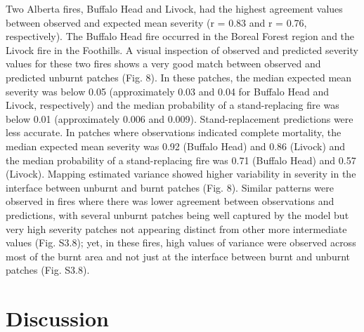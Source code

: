 \documentclass[
  numafflabel,
  authoryear,
  preprint]{elsarticle}
\begin{document}
Two Alberta fires, Buffalo Head and Livock, had the highest agreement
values between observed and expected mean severity (r = 0.83 and r =
0.76, respectively). The Buffalo Head fire occurred in the Boreal Forest
region and the Livock fire in the Foothills. A visual inspection of
observed and predicted severity values for these two fires shows a very
good match between observed and predicted unburnt patches (Fig. 8). In
these patches, the median expected mean severity was below 0.05
(approximately 0.03 and 0.04 for Buffalo Head and Livock, respectively)
and the median probability of a stand-replacing fire was below 0.01
(approximately 0.006 and 0.009). Stand-replacement predictions were less
accurate. In patches where observations indicated complete mortality,
the median expected mean severity was 0.92 (Buffalo Head) and 0.86
(Livock) and the median probability of a stand-replacing fire was 0.71
(Buffalo Head) and 0.57 (Livock). Mapping estimated variance showed
higher variability in severity in the interface between unburnt and
burnt patches (Fig. 8). Similar patterns were observed in fires where
there was lower agreement between observations and predictions, with
several unburnt patches being well captured by the model but very high
severity patches not appearing distinct from other more intermediate
values (Fig. S3.8); yet, in these fires, high values of variance were
observed across most of the burnt area and not just at the interface
between burnt and unburnt patches (Fig. S3.8).

\section{Discussion}\label{discussion}
\end{document}
